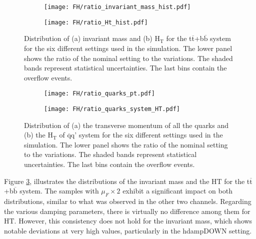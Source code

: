 \begin{figure}[H]
    \centering
    \begin{subfigure}{0.49\textwidth}
        \centering
        \texttt{[image: FH/ratio\_invariant\_mass\_hist.pdf]}
        \caption{}
        \label{subfig:m(ttbb)_FH}        
    \end{subfigure}
    \hfill
    \begin{subfigure}{0.49\linewidth}
        \centering
        \texttt{[image: FH/ratio\_Ht\_hist.pdf]}
        \caption{}
        \label{subfig:HT(ttbb)_FH}
    \end{subfigure}
    \caption{Distribution of (a) invariant mass and (b) H$_{\text{T}}$ for the t$\overline{\text{t}}$+b$\overline{\text{b}}$ system for the six different settings used in the simulation. The lower panel shows the ratio of the nominal setting to the variations. The shaded bands represent statistical uncertainties. The last bins contain the overflow events.}
    \label{fig:ttbb_FH}
\end{figure}
\begin{figure}[H]
    \centering
    \begin{subfigure}{0.49\textwidth}
        \centering
        \texttt{[image: FH/ratio\_quarks\_pt.pdf]}
        \caption{}
        \label{subfig:pt(quarks)_FH}        
    \end{subfigure}
    \hfill
    \begin{subfigure}{0.49\linewidth}
        \centering
        \texttt{[image: FH/ratio\_quarks\_system\_HT.pdf]}
        \caption{}
        \label{subfig:HT(qq)_FH}
    \end{subfigure}
    \caption{Distribution of (a) the transverse momentum of all the quarks and (b) the H$_{\text{T}}$ of $\overline{\text{q}}$q' system for the six different settings used in the simulation. The lower panel shows the ratio of the nominal setting to the variations. The shaded bands represent statistical uncertainties. The last bins contain the overflow events.}
    \label{fig:quarks_all_FH}
\end{figure}
\indent Figure \ref{fig:ttbb_FH}, illustrates the distributions of the invariant mass and the H${\text{T}}$ for the t$\overline{\text{t}}$+b$\overline{\text{b}}$ system. The samples with $\mu_F \times 2$ exhibit a significant impact on both distributions, similar to what was observed in the other two channels. Regarding the various damping parameters, there is virtually no difference among them for H${\text{T}}$. However, this consistency does not hold for the invariant mass, which shows notable deviations at very high values, particularly in the hdampDOWN setting.\\
